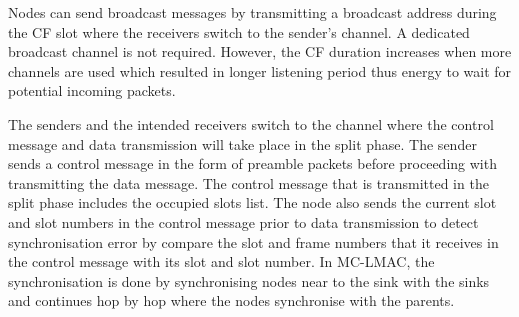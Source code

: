 Nodes can send broadcast messages by transmitting a broadcast address during the CF slot where the receivers switch to the sender's channel. A dedicated broadcast channel is not required. However, the CF duration increases when more channels are used which resulted in longer listening period thus energy to wait for potential incoming packets.

The senders and the intended receivers switch to the channel where the control message and data transmission will take place in the split phase. The sender sends a control message in the form of preamble packets before proceeding with transmitting the data message. The control message that is transmitted in the split phase includes the occupied slots list. The node also sends the current slot and slot numbers in the control message prior to data transmission to detect synchronisation error by compare the slot and frame numbers that it receives in the control message with its slot and slot number. In MC-LMAC, the synchronisation is done by synchronising nodes near to the sink with the sinks and continues hop by hop where the nodes synchronise with the parents. 
 




